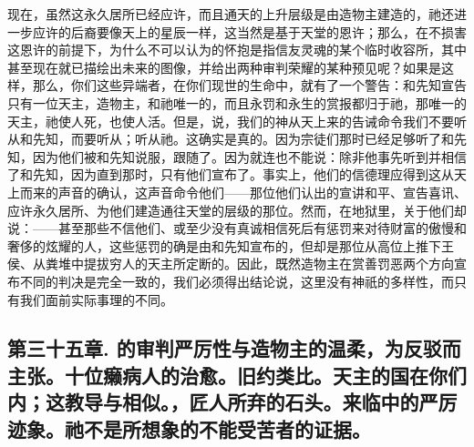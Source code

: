 现在，虽然这永久居所已经应许，而且通天的上升层级是由造物主建造的，祂还进一步应许的后裔要像天上的星辰一样，这当然是基于天堂的恩许；那么，在不损害这恩许的前提下，为什么不可以认为的怀抱是指信友灵魂的某个临时收容所，其中甚至现在就已描绘出未来的图像，并给出两种审判荣耀的某种预见呢？如果是这样，那么，你们这些异端者，在你们现世的生命中，就有了一个警告：和先知宣告只有一位天主，造物主，和祂唯一的，而且永罚和永生的赏报都归于祂，那唯一的天主，祂使人死，也使人活。但是，说，我们的神从天上来的告诫命令我们不要听从和先知，而要听从；听从祂。这确实是真的。因为宗徒们那时已经足够听了和先知，因为他们被和先知说服，跟随了。因为就连也不能说：除非他事先听到并相信了和先知，因为直到那时，只有他们宣布了。事实上，他们的信德理应得到这从天上而来的声音的确认，这声音命令他们——那位他们认出的宣讲和平、宣告喜讯、应许永久居所、为他们建造通往天堂的层级的那位。然而，在地狱里，关于他们却说：——甚至那些不信他们、或至少没有真诚相信死后有惩罚来对待财富的傲慢和奢侈的炫耀的人，这些惩罚的确是由和先知宣布的，但却是那位从高位上推下王侯、从粪堆中提拔穷人的天主所定断的。因此，既然造物主在赏善罚恶两个方向宣布不同的判决是完全一致的，我们必须得出结论说，这里没有神祇的多样性，而只有我们面前实际事理的不同。\par


\subsection{第三十五章. 的审判严厉性与造物主的温柔，为反驳而主张。十位癞病人的治愈。旧约类比。天主的国在你们内；这教导与相似。，匠人所弃的石头。来临中的严厉迹象。祂不是所想象的不能受苦者的证据。}

